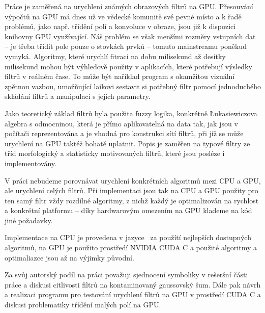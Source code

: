 


Práce je zaměřená na urychlení známých obrazových filtrů na GPU. Přesouvání výpočtů na GPU má dnes už ve vědecké komunitě své pevné místo a k řadě problémů, jako např. třídění polí a konvoluce v obraze, jsou již k dispozici knihovny GPU využívající. Náš problém se však menšími rozměry vstupních dat -- je třeba třídit pole pouze o stovkách prvků -- tomuto mainstreamu poněkud vymyká. Algoritmy, které urychlí fitraci na dobu milisekund až desítky milisekund mohou být výhledově použity v aplikacích, které potřebují výsledky filtrů v reálném čase. To může být naříklad program s okamžitou vizuální zpětnou vazbou, umožňující laikovi sestavit si potřebný filtr pomocí jednoduchého skládání filtrů a manipulací s jejich parametry.

Jako teoretický základ filtrů byla použita fuzzy logika, konkrétně \L ukasiewiczova algebra s odmocninou, která je přímo aplikovatelná na data tak, jak jsou v počítači reprezentována a je vhodná pro konstrukci sítí filtrů, při jíž se může urychlení na GPU taktéž bohatě uplatnit.
Popis je zaměřen na typové filtry ze tříd morfologický a statisticky motivovaných filtrů, které jsou posléze i implementovány.

V práci nebudeme porovnávat urychlení konkrétních algoritmů mezi CPU a GPU, ale urychlení celých filtrů. Při implementaci jsou tak na CPU a GPU použity pro ten samý filtr vždy rozdílné algoritmy, z nichž každý je optimalizován na rychlost a konkrétní platformu -- díky hardwarovým omezením na GPU klademe na kód jiné požadavky.

Implementace na CPU je provedena v jazyce \Cpp ~za použítí nejlepších dostupných algoritmů, na GPU je použito prostředí NVIDIA CUDA C a použité algoritmy a optimaliazce jsou až na výjimky původní.

Za svůj autorský podíl na práci považuji sjednocení symboliky v rešeršní části práce a diskusi citlivosti filtrů na kontaminovaný gaussovský šum. Dále pak návrh a realizaci programu pro testování urychlení filtrů na GPU v prostředí CUDA C a diskusi problematiky třídění malých polí na GPU.
